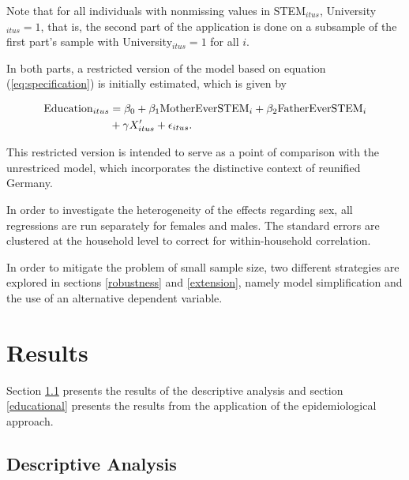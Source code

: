 \documentclass[a4paper, oneside, hyperfootnotes = false]{article}
\begin{document}
{Note that for all individuals with nonmissing values in STEM$_{itus}$, University$_{itus} = 1$, that is, the second part of the application is done on a subsample of the first part's sample with University$_{itus} = 1$ for all $i$.

In both parts, a restricted version of the model based on equation (\ref{eq:specification}) is initially estimated, which is given by

\vspace{-8mm}

\begin{equation}
	\begin{split}
		\label{eq:specificationrestr}
		\textnormal{Education}_{itus} &={} \beta_{0} + \beta_{1}\textnormal{MotherEverSTEM}_{i} + \beta_{2}\textnormal{FatherEverSTEM}_{i} \\
		& + \gamma{}X'_{itus} + \epsilon_{itus}\textnormal{.}
	\end{split}
\end{equation}

This restricted version is intended to serve as a point of comparison with the unrestriced model, which incorporates the distinctive context of reunified Germany.

In order to investigate the heterogeneity of the effects regarding sex, all regressions are run separately for females and males.
The standard errors are clustered at the household level to correct for within-household correlation.

In order to mitigate the problem of small sample size, two different strategies are explored in sections \ref{robustness} and \ref{extension}, namely model simplification and the use of an alternative dependent variable.

\section{Results}
\label{results}

Section \ref{descriptives} presents the results of the descriptive analysis and section \ref{educational} presents the results from the application of the epidemiological approach.

\subsection{Descriptive Analysis}
\label{descriptives}

}
\end{document}

